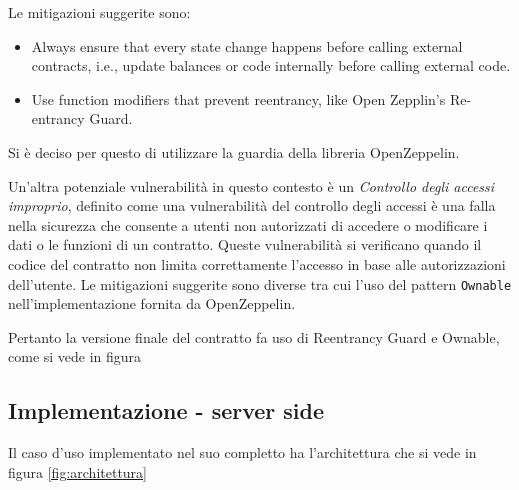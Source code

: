 \documentclass[a4paper,11pt]{article}
\begin{document}
Le mitigazioni suggerite sono:

\begin{itemize}
  \item Always ensure that every state change happens before calling external contracts, i.e., update balances or code internally before calling external code. \cite{owaspReentrancy}
  \item Use function modifiers that prevent reentrancy, like Open Zepplin’s Re-entrancy Guard. \cite{owaspReentrancy}
\end{itemize}

Si è deciso per questo di utilizzare la guardia della libreria OpenZeppelin.

Un'altra potenziale vulnerabilità in questo contesto è un \textit{Controllo degli accessi improprio}, definito come una vulnerabilità del controllo degli accessi è una falla nella sicurezza che consente a utenti non autorizzati di accedere o modificare i dati o le funzioni di un contratto. Queste vulnerabilità si verificano quando il codice del contratto non limita correttamente l'accesso in base alle autorizzazioni dell'utente. \cite{owaspOWASPSmart} Le mitigazioni suggerite sono diverse tra cui l'uso del pattern \texttt{Ownable} nell'implementazione fornita da OpenZeppelin.

Pertanto la versione finale del contratto fa uso di Reentrancy Guard e Ownable, come si vede in figura

\subsection{Implementazione - server side}


Il caso d'uso implementato nel suo completto ha l'architettura che si vede in figura \ref{fig:architettura}
\end{document}
